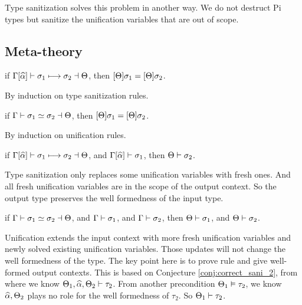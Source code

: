Type sanitization solves this problem in another way. We do not destruct Pi
types but sanitize the unification variables that are out of scope.

\subsection{Meta-theory}

\begin{conjecture}
  if $\Gamma[\widehat{\alpha}] \vdash \sigma_1 \longmapsto \sigma_2 \dashv \Theta$,
  then $[\Theta] \sigma_1 = [\Theta] \sigma_2$.
\end{conjecture}
\begin{hproof}
  By induction on type sanitization rules.
\end{hproof}

\begin{conjecture}
  if $\Gamma \vdash \sigma_1 \simeq \sigma_2 \dashv \Theta$,
  then $[\Theta] \sigma_1 = [\Theta] \sigma_2$.
\end{conjecture}
\begin{hproof}
  By induction on unification rules.
\end{hproof}

\begin{conjecture}
  \label{conj:correct_sani_2}
  if $\Gamma[\widehat{\alpha}] \vdash \sigma_1 \longmapsto \sigma_2 \dashv \Theta$,
  and $\Gamma[\widehat{\alpha}] \vdash \sigma_1$,
  then $\Theta \vdash \sigma_2$.
\end{conjecture}
\begin{hproof}
  Type sanitization only replaces some unification variables with
  fresh ones. And all fresh unification variables are in the
  scope of the output context. So the output type preserves the well formedness
  of the input type.
\end{hproof}

\begin{conjecture}
  if $\Gamma \vdash \sigma_1 \simeq \sigma_2 \dashv \Theta$,
  and $\Gamma \vdash \sigma_1$,
  and $\Gamma \vdash \sigma_2$,
  then $\Theta \vdash \sigma_1$,
  and $\Theta \vdash \sigma_2$.
\end{conjecture}
\begin{hproof}
  Unification extends the input context with more fresh unification variables
  and newly solved existing unification variables. Those updates will not change
  the well formedness of the type. The key point here is to prove  rule
   and  give well-formed output contexts. This is
  based on Conjecture \ref{conj:correct_sani_2}, from where we know $\Theta_1,
  \widehat{\alpha}, \Theta_2 \vdash \tau_2$. From another precondition $\Theta_1 \vDash
  \tau_2$, we know $\widehat{\alpha}, \Theta_2$
  plays no role for the well formedness of $\tau_2$. So $\Theta_1 \vdash \tau_2$.
\end{hproof}